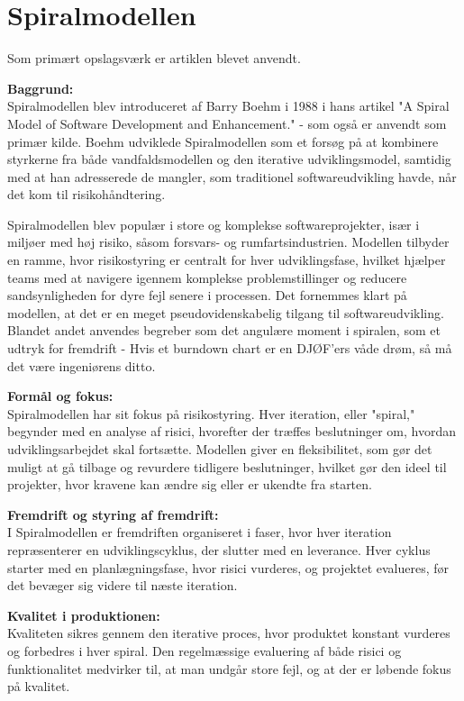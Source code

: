 \chapter{Spiralmodellen}
\label{chapter:3rdchapter}
Som primært opslagsværk er artiklen \cite{boehm1988spiral} blevet anvendt. 

\textbf{Baggrund:}\\
Spiralmodellen blev introduceret af Barry Boehm i 1988 i hans artikel "A Spiral Model of Software Development and Enhancement." - som også er anvendt som primær kilde. 
Boehm udviklede Spiralmodellen som et forsøg på at kombinere styrkerne fra både vandfaldsmodellen og den iterative udviklingsmodel, 
samtidig med at han adresserede de mangler, som traditionel softwareudvikling havde, når det kom til risikohåndtering.

Spiralmodellen blev populær i store og komplekse softwareprojekter, især i miljøer med høj risiko, 
såsom forsvars- og rumfartsindustrien. Modellen tilbyder en ramme, hvor risikostyring er centralt for hver udviklingsfase, 
hvilket hjælper teams med at navigere igennem komplekse problemstillinger og reducere sandsynligheden for dyre fejl senere i processen.
Det fornemmes klart på modellen, at det er en meget pseudovidenskabelig tilgang til softwareudvikling. 
Blandet andet anvendes begreber som det angulære moment i spiralen, som et udtryk for fremdrift - Hvis et burndown chart er en DJØF'ers våde drøm, så må det være ingeniørens ditto.

\textbf{Formål og fokus:}\\
Spiralmodellen har sit fokus på risikostyring. Hver iteration, eller "spiral," begynder med en analyse af risici, 
hvorefter der træffes beslutninger om, hvordan udviklingsarbejdet skal fortsætte. Modellen giver en fleksibilitet, 
som gør det muligt at gå tilbage og revurdere tidligere beslutninger, hvilket gør den ideel til projekter, hvor kravene kan ændre sig eller er ukendte fra starten.

\textbf{Fremdrift og styring af fremdrift:}\\
I Spiralmodellen er fremdriften organiseret i faser, hvor hver iteration repræsenterer en udviklingscyklus, der slutter med en leverance. 
Hver cyklus starter med en planlægningsfase, hvor risici vurderes, og projektet evalueres, før det bevæger sig videre til næste iteration.

\textbf{Kvalitet i produktionen:}\\
Kvaliteten sikres gennem den iterative proces, hvor produktet konstant vurderes og forbedres i hver spiral. 
Den regelmæssige evaluering af både risici og funktionalitet medvirker til, at man undgår store fejl, og at der er løbende fokus på kvalitet.

